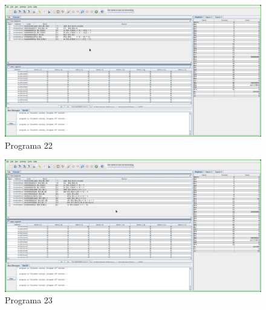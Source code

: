 \documentclass[a4paper,11pt,fleqn]{article}
\begin{document}
\begin{figure}[!ht]
    \caption{Programa 22}
    \centering
    \includegraphics[width=1\textwidth]{programa22}
\end{figure}

\begin{figure}[!ht]
    \caption{Programa 23}
    \centering
    \includegraphics[width=1\textwidth]{programa23}
\end{figure}
\end{document}
